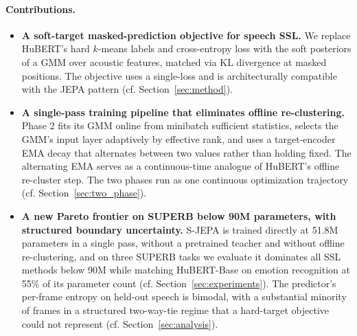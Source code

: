 \documentclass[9pt,twocolumn]{article}
\theoremstyle{plain}
\theoremstyle{definition}
\theoremstyle{remark}
\begin{document}
\paragraph{Contributions.}
\begin{itemize}
\item \textbf{A soft-target masked-prediction objective for speech SSL.} 
We replace HuBERT's hard $k$-means labels and cross-entropy loss with the 
soft posteriors of a GMM over acoustic features, matched via KL 
divergence at masked positions. The objective uses a single-loss and is
architecturally compatible with the JEPA pattern (cf. Section~\ref{sec:method}).

\item \textbf{A single-pass training pipeline that eliminates offline 
re-clustering.} Phase 2 fits its GMM online from minibatch sufficient 
statistics, selects the GMM's input layer adaptively by effective rank, 
and uses a target-encoder EMA decay that alternates between two values 
rather than holding fixed. The alternating EMA serves as a 
continuous-time analogue of HuBERT's offline re-cluster step. The two 
phases run as one continuous optimization trajectory 
(cf. Section~\ref{sec:two_phase}).

\item \textbf{A new Pareto frontier on SUPERB below 90M parameters, with 
structured boundary uncertainty.} S-JEPA is trained directly at 51.8M 
parameters in a single pass, without a pretrained teacher and without 
offline re-clustering, and on three SUPERB tasks we evaluate it dominates 
all SSL methods below 90M while matching HuBERT-Base on emotion 
recognition at 55\% of its parameter count (cf. Section~\ref{sec:experiments}). 
The predictor's per-frame entropy on held-out speech is bimodal, with a 
substantial minority of frames in a structured two-way-tie regime that a 
hard-target objective could not represent (cf. Section~\ref{sec:analysis}).
\end{itemize}


\iffalse
\end{document}
